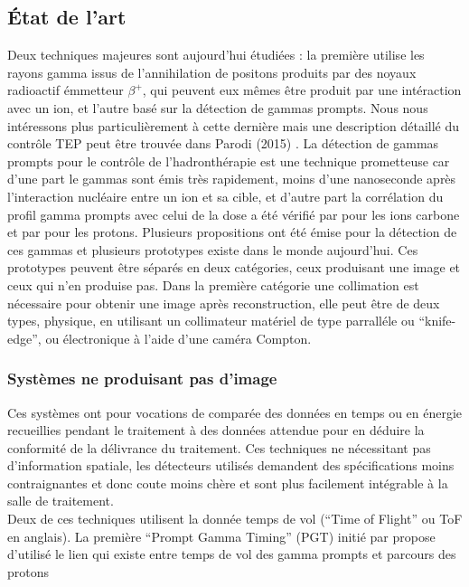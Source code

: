 \documentclass[11pt,a4paper,oldfontcommands]{memoir}
\begin{document}
\subsection{\'Etat de l'art}

Deux techniques majeures sont aujourd'hui étudiées : la première utilise les rayons gamma issus de l'annihilation de positons produits par des noyaux radioactif émmetteur $\beta^+$, qui peuvent eux mêmes être produit par une intéraction avec un ion, et l'autre basé sur la détection de gammas prompts. Nous nous intéressons plus particulièrement à cette dernière mais une description détaillé du contrôle TEP peut être trouvée dans Parodi (2015) \cite{Parodi20157153}. La détection de gammas prompts pour le contrôle de l'hadronthérapie est une technique prometteuse car d'une part le gammas sont émis très rapidement, moins d'une nanoseconde après l’interaction nucléaire entre un ion et sa cible, et d'autre part la corrélation du profil gamma prompts avec celui de la dose a été vérifié par \cite{PGMonitoringC12}pour les ions carbone et par \cite{Min2006} pour les protons. Plusieurs propositions ont été émise pour la détection de ces gammas et plusieurs prototypes existe dans le monde aujourd'hui. Ces prototypes peuvent être séparés en deux catégories, ceux produisant une image et ceux qui n'en produise pas. Dans la première catégorie une collimation est nécessaire pour obtenir une image après reconstruction, elle peut être de deux types, physique, en utilisant un collimateur matériel de type parralléle ou \enquote{knife-edge}, ou électronique à l'aide d'une caméra Compton. 

\subsubsection{Systèmes ne produisant pas d'image}
Ces systèmes ont pour vocations de comparée des données en temps ou en énergie recueillies pendant le traitement à des données attendue pour en déduire la conformité de la délivrance du traitement. Ces techniques ne nécessitant pas d'information spatiale, les détecteurs utilisés demandent des spécifications moins contraignantes et donc coute moins chère et sont plus facilement intégrable à la salle de traitement.\\
Deux de ces techniques utilisent la donnée temps de vol (\enquote{Time of Flight} ou ToF en anglais). La première \enquote{Prompt Gamma Timing} (PGT) initié par \cite{Golnik_2014} propose d'utilisé le lien qui existe entre temps de vol des gamma prompts et parcours des protons 
\end{document}
